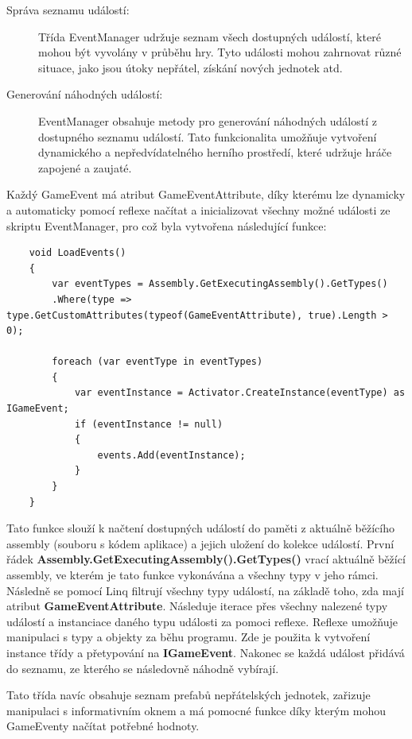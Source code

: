\begin{description}
	\item[Správa seznamu událostí:] Třída EventManager udržuje seznam všech dostupných událostí, které mohou být vyvolány v průběhu hry. Tyto události mohou zahrnovat různé situace, jako jsou útoky nepřátel, získání nových jednotek atd.
	\item[Generování náhodných událostí:] EventManager obsahuje metody pro generování náhodných událostí z dostupného seznamu událostí. Tato funkcionalita umožňuje vytvoření dynamického a nepředvídatelného herního prostředí, které udržuje hráče zapojené a zaujaté.
\end{description}

Každý GameEvent má atribut GameEventAttribute, díky kterému lze dynamicky a automaticky pomocí reflexe načítat a inicializovat všechny možné události ze skriptu EventManager, pro což byla vytvořena následující funkce:

\begin{lstlisting}
	void LoadEvents()
	{
		var eventTypes = Assembly.GetExecutingAssembly().GetTypes()
		.Where(type => type.GetCustomAttributes(typeof(GameEventAttribute), true).Length > 0);

		foreach (var eventType in eventTypes)
		{
			var eventInstance = Activator.CreateInstance(eventType) as IGameEvent;
			if (eventInstance != null)
			{
				events.Add(eventInstance);
			}
		}
	}
\end{lstlisting}

Tato funkce slouží k načtení dostupných událostí do paměti z aktuálně běžícího assembly (souboru s kódem aplikace) a jejich uložení do kolekce událostí. První řádek \textbf{Assembly.GetExecutingAssembly().GetTypes()} vrací aktuálně běžící assembly, ve kterém je tato funkce vykonávána a všechny typy v jeho rámci. Následně se pomocí Linq filtrují všechny typy událostí, na základě toho, zda mají atribut \textbf{GameEventAttribute}. Následuje iterace přes všechny nalezené typy událostí a instanciace daného typu události za pomoci reflexe. Reflexe umožňuje manipulaci s typy a objekty za běhu programu. Zde je použita k vytvoření instance třídy a přetypování na \textbf{IGameEvent}. Nakonec se každá událost přidává do seznamu, ze kterého se následovně náhodně vybírají.

Tato třída navíc obsahuje seznam prefabů nepřátelských jednotek, zařizuje manipulaci s informativním oknem a má pomocné funkce díky kterým mohou GameEventy načítat potřebné hodnoty.

